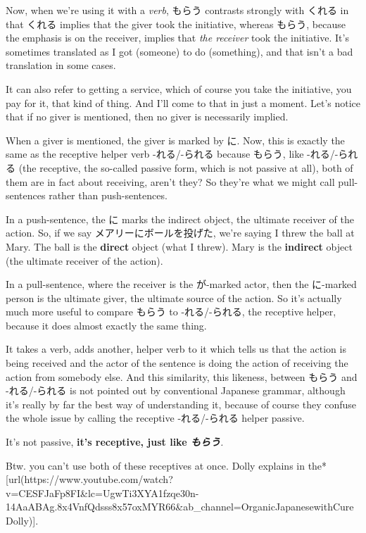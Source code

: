 \thinrule

Now, when we're using it with a {\em verb}, もらう contrasts strongly with くれる in that くれる implies that the giver took the initiative, whereas もらう, because the emphasis is on the receiver, implies that {\em the receiver} took the initiative. It's sometimes translated as I got (someone) to do (something), and that isn't a bad translation in some cases.

It can also refer to getting a service, which of course you take the initiative, you pay for it, that kind of thing. And I'll come to that in just a moment. Let's notice that if no giver is mentioned, then no giver is necessarily implied.

When a giver is mentioned, the giver is marked by に. Now, this is exactly the same as the receptive helper verb -れる/-られる because もらう, like -れる/-られる (the receptive, the so-called passive form, which is not passive at all), both of them are in fact about receiving, aren't they? So they're what we might call pull-sentences rather than push-sentences.

In a push-sentence, the に marks the indirect object, the ultimate receiver of the action. So, if we say メアリーにボールを投げた, we're saying I threw the ball at Mary. The ball is the {\bf direct} object (what I threw). Mary is the {\bf indirect} object (the ultimate receiver of the action).

{}

In a pull-sentence, where the receiver is the が-marked actor, then the に-marked person is the ultimate giver, the ultimate source of the action. So it's actually much more useful to compare もらう to -れる/-られる, the receptive helper, because it does almost exactly the same thing.

It takes a verb, adds another, helper verb to it which tells us that the action is being received and the actor of the sentence is doing the action of receiving the action from somebody else. And this similarity, this likeness, between もらう and -れる/-られる is not pointed out by conventional Japanese grammar, although it's really by far the best way of understanding it, because of course they confuse the whole issue by calling the receptive -れる/-られる helper passive.

It's not passive, {\bf it's receptive, just like {\em もらう}}{\em .}

Btw. you can't use both of these receptives at once. Dolly explains in the* [url(https://www.youtube.com/watch?v=CESFJaFp8FI&lc=UgwTi3XYA1fzqe30n-14AaABAg.8x4VnfQdsss8x57oxMYR66&ab_channel=OrganicJapanesewithCureDolly)].


